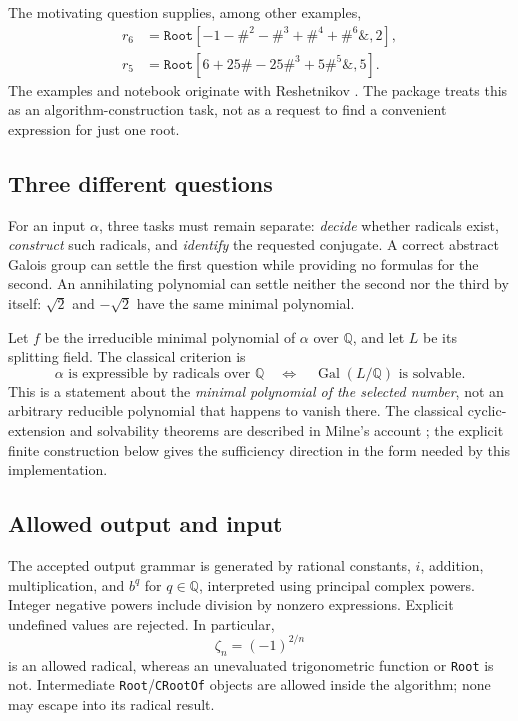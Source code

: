 \documentclass[11pt]{article}
\theoremstyle{definition}\newtheorem{definition}[theorem]{Definition}
\theoremstyle{remark}\newtheorem{remark}[theorem]{Remark}
\newcommand{\Q}{\mathbb Q}\newcommand{\C}{\mathbb C}\newcommand{\Z}{\mathbb Z}
\DeclareMathOperator{\Gal}{Gal}\DeclareMathOperator{\Res}{Res}
\newcommand{\code}[1]{\texttt{#1}}
\begin{document}
The motivating question supplies, among other examples,
\begin{align}
 r_6&=\code{Root}[-1-\#^2-\#^3+\#^4+\#^6\mathbin{\&},2],\label{eq:r6}\\
 r_5&=\code{Root}[6+25\#-25\#^3+5\#^5\mathbin{\&},5].\label{eq:r5}
\end{align}
The examples and notebook originate with Reshetnikov \cite{question,notebook}.
The package treats this as an algorithm-construction task, not as a request to
find a convenient expression for just one root.

\subsection{Three different questions}

For an input $\alpha$, three tasks must remain separate:
\emph{decide} whether radicals exist, \emph{construct} such radicals, and
\emph{identify} the requested conjugate. A correct abstract Galois group can
settle the first question while providing no formulas for the second. An
annihilating polynomial can settle neither the second nor the third by itself:
$\sqrt2$ and $-\sqrt2$ have the same minimal polynomial.

Let $f$ be the irreducible minimal polynomial of $\alpha$ over $\Q$, and let $L$
be its splitting field. The classical criterion is
\begin{equation}\label{eq:criterion}
 \alpha\text{ is expressible by radicals over }\Q
 \quad\Longleftrightarrow\quad \Gal(L/\Q)\text{ is solvable}.
\end{equation}
This is a statement about the \emph{minimal polynomial of the selected number},
not an arbitrary reducible polynomial that happens to vanish there. The
classical cyclic-extension and solvability theorems are described in
Milne's account \cite{milne}; the explicit finite construction below gives the
sufficiency direction in the form needed by this implementation.

\subsection{Allowed output and input}

The accepted output grammar is generated by rational constants, $i$, addition,
multiplication, and $b^q$ for $q\in\Q$, interpreted using principal complex
powers. Integer negative powers include division by nonzero expressions.
Explicit undefined values are rejected. In particular,
\begin{equation}
 \zeta_n=(-1)^{2/n}
\end{equation}
is an allowed radical, whereas an unevaluated trigonometric function or
\code{Root} is not. Intermediate \code{Root}/\code{CRootOf} objects are allowed
inside the algorithm; none may escape into its radical result.
\end{document}
